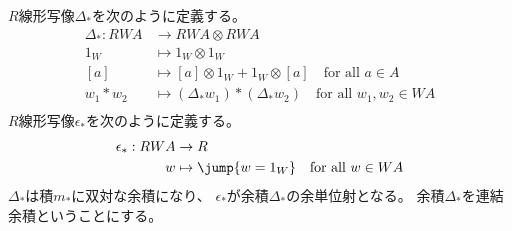 	\begin{definition}[連結余積]\label{def:連結余積} %
		$R$線形写像$\Delta_*$を次のように定義する。
		\begin{equation}\begin{split} %
			\Delta_*: RWA &\to RWA\otimes RWA \\
			1_W &\mapsto 1_W\otimes 1_W \\
			[a] &\mapsto [a]\otimes 1_W + 1_W\otimes [a] 
			\quad\text{for all }a\in A \\
			w_1*w_2 &\mapsto (\Delta_*w_1)*(\Delta_*w_2) 
			\quad\text{for all }w_1,w_2\in WA \\
		\end{split}\end{equation} %
		$R$線形写像$\epsilon_*$を次のように定義する。
		\begin{equation}\begin{split} %
			\epsilon_*: RWA &\to R \\
				w &\mapsto \jump{w=1_W}\quad\text{for all }w\in WA
		\end{split}\end{equation} %
		$\Delta_*$は積$m_*$に双対な余積になり、
		$\epsilon_*$が余積$\Delta_*$の余単位射となる。
		余積$\Delta_*$を連結余積ということにする。
	\end{definition} %

